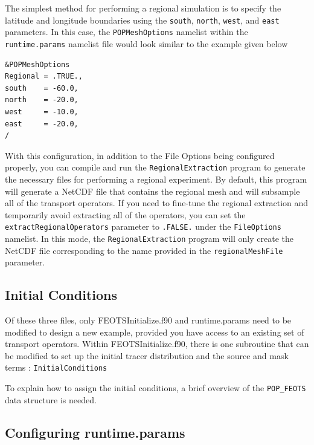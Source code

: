 \documentclass{softwaremanual}
\begin{document}
 The simplest method for performing a regional simulation is to specify the latitude and longitude boundaries using the \texttt{south}, \texttt{north}, \texttt{west}, and \texttt{east} parameters. In this case, the \texttt{POPMeshOptions} namelist within the \texttt{runtime.params} namelist file would look similar to the example given below
\begin{verbatim}
&POPMeshOptions
Regional = .TRUE.,
south    = -60.0,
north    = -20.0,
west     = -10.0,
east     = -20.0,
/
\end{verbatim}
With this configuration, in addition to the File Options being configured properly, you can compile and run the \texttt{RegionalExtraction} program to generate the necessary files for performing a regional experiment. By default, this program will generate a NetCDF file that contains the regional mesh and will subsample all of the transport operators. If you need to fine-tune the regional extraction and temporarily avoid extracting all of the operators, you can set the \texttt{extractRegionalOperators} parameter to \texttt{.FALSE.} under the \texttt{FileOptions} namelist. In this mode, the \texttt{RegionalExtraction} program will only create the NetCDF file corresponding to the name provided in the \texttt{regionalMeshFile} parameter.

\subsection{Initial Conditions}
Of these three files, only FEOTSInitialize.f90 and runtime.params need to be modified to design a new example, provided you have access to an existing set of transport operators. Within FEOTSInitialize.f90, there is one subroutine that can be modified to set up the initial tracer distribution and the source and mask terms  : \texttt{InitialConditions}

To explain how to assign the initial conditions, a brief overview of the \texttt{POP\_FEOTS} data structure is needed.
 
 

\subsection{Configuring runtime.params}



 
\end{document}
